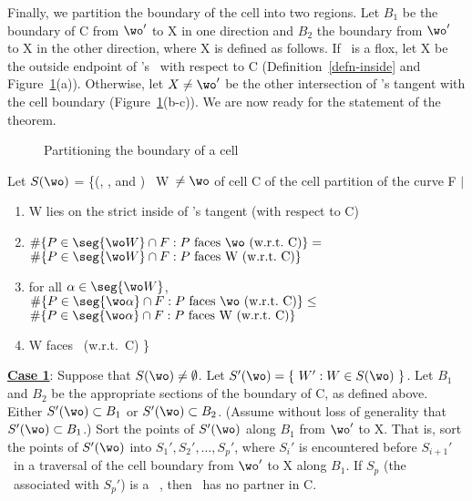 Finally, we partition the boundary of the cell into two regions.
Let $B_{1}$ be the boundary of C from $\wo '$ to X in one direction
and $B_{2}$ the boundary from $\wo '$ to X in the other direction, where
X is defined as follows.
If \wo\ is a flox, let X be the outside endpoint of \wo's 
\cellsegment\ with respect to C (Definition~\ref{defn-inside} and
Figure~\ref{3.8A}(a)).
Otherwise, let $X \neq \wo '$ be the other intersection of \wo's tangent with
the cell boundary (Figure~\ref{3.8A}(b-c)).
We are now ready for the statement of the theorem.
%
\begin{figure}[htb]\vspace{4.5in}\caption{Partitioning the boundary of a cell}\label{3.8A}\end{figure}
%
\begin{theorem}
\label{thm-partner}
Let $S(\wo)$ = \{(\original, \pseudoalone, and \artificial) \wallpoints\ 
\mbox{W $\neq \wo$} of cell C of the cell partition of the curve F $\mid$\nopagebreak
\begin{enumerate}
\item W lies on the strict inside of \wo's tangent (with respect
to C) \nopagebreak
\item $\#\{P \in\seg{\wo W}\cap F: P \mbox{ faces \wo\ (w.r.t.\ C)}\}=$\\
$\#\{P \in \seg{\wo W}\cap F: P \mbox{ faces W (w.r.t.\ C)\} }$\nopagebreak
\item for all $\alpha \in \seg{\wo W}$, \\\nopagebreak
$ \#\{P \in\seg{\wo\alpha}\cap F: P \mbox{ faces \wo\ (w.r.t.\ C)}\} \leq$\\
$ \#\{P \in\seg{\wo\alpha}\cap F: P \mbox{ faces W (w.r.t.\ C)\} }  $
\item W faces \wo\ (w.r.t.\ C) \}
\end{enumerate}
%
\underline{{\bf Case 1}}: Suppose that $S(\wo) \neq \emptyset$.
Let \mbox{$S'(\wo) = \{\ W':W \in S(\wo)\ \}$}.
Let $B_{1}$ and $B_{2}$ be the appropriate sections of the boundary of C,
as defined above.
Either \mbox{$S'(\wo) \subset B_{1}$} or \mbox{$S'(\wo) \subset B_{2}$}.
(Assume without loss of generality that \mbox{$S'(\wo) \subset B_{1}$}.)
Sort the points of $S'(\wo)$ along $B_{1}$ from $\wo '$ to X.
That is, sort the points of $S'(\wo)$ into $S_{1}',S_{2}',\ldots,S_{p}'$,
where $S_{i}'$ is encountered before $S_{i+1}'$\ in a traversal of the
cell boundary from $\wo '$ to X along $B_{1}$.
If $S_{p}$ (the \wallpoint\ associated with $S_{p}'$) is a \artificial\
\wallpoint, then \wo\ has no partner in C.

\end{theorem}

